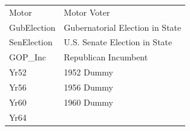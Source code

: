 \documentclass[]{book}
\begin{document}
\begin{longtable}[]{@{}ll@{}}
\begin{minipage}[t]{0.05\columnwidth}\raggedright\strut
Motor\strut
\end{minipage} & \begin{minipage}[t]{0.89\columnwidth}\raggedright\strut
Motor Voter\strut
\end{minipage}\tabularnewline
\begin{minipage}[t]{0.05\columnwidth}\raggedright\strut
GubElection\strut
\end{minipage} & \begin{minipage}[t]{0.89\columnwidth}\raggedright\strut
Gubernatorial Election in State\strut
\end{minipage}\tabularnewline
\begin{minipage}[t]{0.05\columnwidth}\raggedright\strut
SenElection\strut
\end{minipage} & \begin{minipage}[t]{0.89\columnwidth}\raggedright\strut
U.S. Senate Election in State\strut
\end{minipage}\tabularnewline
\begin{minipage}[t]{0.05\columnwidth}\raggedright\strut
GOP\_Inc\strut
\end{minipage} & \begin{minipage}[t]{0.89\columnwidth}\raggedright\strut
Republican Incumbent\strut
\end{minipage}\tabularnewline
\begin{minipage}[t]{0.05\columnwidth}\raggedright\strut
Yr52\strut
\end{minipage} & \begin{minipage}[t]{0.89\columnwidth}\raggedright\strut
1952 Dummy\strut
\end{minipage}\tabularnewline
\begin{minipage}[t]{0.05\columnwidth}\raggedright\strut
Yr56\strut
\end{minipage} & \begin{minipage}[t]{0.89\columnwidth}\raggedright\strut
1956 Dummy\strut
\end{minipage}\tabularnewline
\begin{minipage}[t]{0.05\columnwidth}\raggedright\strut
Yr60\strut
\end{minipage} & \begin{minipage}[t]{0.89\columnwidth}\raggedright\strut
1960 Dummy\strut
\end{minipage}\tabularnewline
\begin{minipage}[t]{0.05\columnwidth}\raggedright\strut
Yr64\strut

\end{minipage}
\end{longtable}
\end{document}
